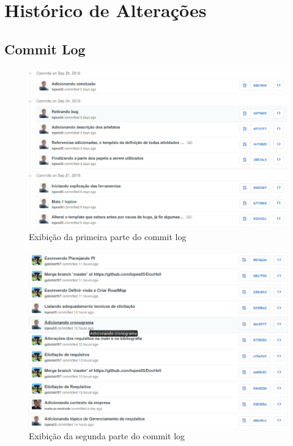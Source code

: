 \partanexos
\chapter{Histórico de Alterações}

\section{Commit Log}

\begin{figure}[!htpb]
	\centering
	\includegraphics[scale=0.5]{figuras/cronograma/1}
	\caption{Exibição da primeira parte do commit log}
	\end{figure}

\begin{figure}[!htpb]
	\centering
	\includegraphics[scale=0.5]{figuras/cronograma/2}
	\caption{Exibição da segunda parte do commit log}
	\end{figure}

